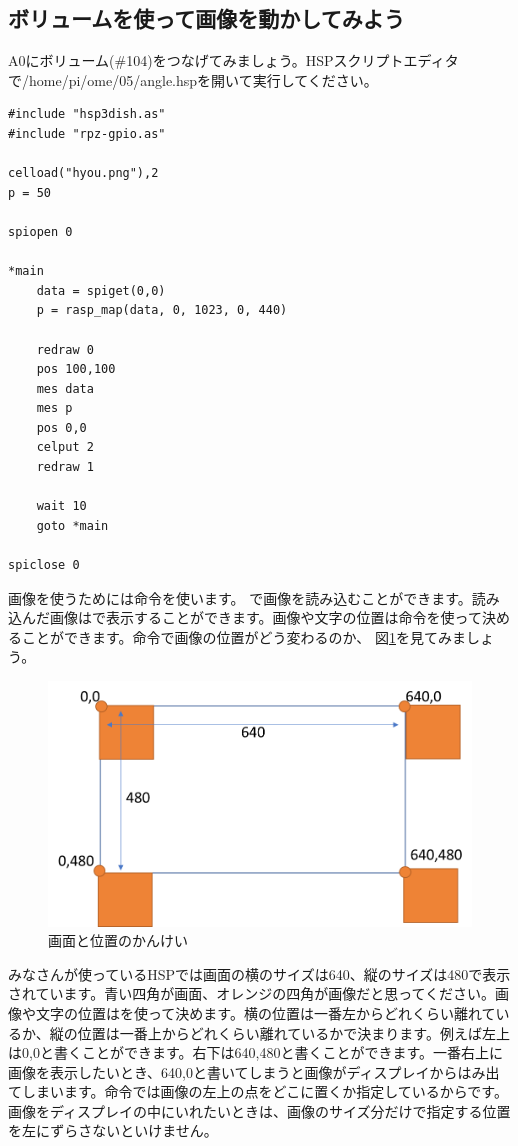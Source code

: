 \subsection{ボリュームを使って画像を動かしてみよう}
A0にボリューム(\#104)をつなげてみましょう。HSPスクリプトエディタで/home/pi/ome/05/angle.hspを開いて実行してください。\\

\begin{lstlisting}[caption=angle.hsp,label=angle.hsp]
#include "hsp3dish.as"
#include "rpz-gpio.as"

celload("hyou.png"),2
p = 50

spiopen 0

*main
	data = spiget(0,0)
	p = rasp_map(data, 0, 1023, 0, 440)

	redraw 0
	pos 100,100
	mes data
	mes p
	pos 0,0
	celput 2
	redraw 1

	wait 10	
	goto *main

spiclose 0
\end{lstlisting}

画像を使うためには命令を使います。
で画像を読み込むことができます。読み込んだ画像はで表示することができます。画像や文字の位置は命令を使って決めることができます。命令で画像の位置がどう変わるのか、 図\ref{angle.hsp}を見てみましょう。

\begin{figure}[H]
\centering
\includegraphics[scale=0.8]{images/chap05/text05-img034.png}
\caption{画面と位置のかんけい}
\label{angle.hsp}
\end{figure}

みなさんが使っているHSPでは画面の横のサイズは640、縦のサイズは480で表示されています。青い四角が画面、オレンジの四角が画像だと思ってください。画像や文字の位置はを使って決めます。横の位置は一番左からどれくらい離れているか、縦の位置は一番上からどれくらい離れているかで決まります。例えば左上は0,0と書くことができます。右下は640,480と書くことができます。一番右上に画像を表示したいとき、640,0と書いてしまうと画像がディスプレイからはみ出てしまいます。命令では画像の左上の点をどこに置くか指定しているからです。画像をディスプレイの中にいれたいときは、画像のサイズ分だけで指定する位置を左にずらさないといけません。\\

